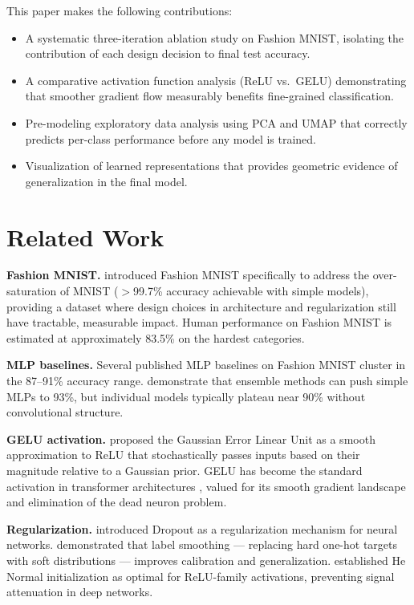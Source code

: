 \documentclass[12pt,letterpaper]{article}
\begin{document}
This paper makes the following contributions:
\begin{itemize}
    \item A systematic three-iteration ablation study on Fashion MNIST, isolating the contribution of each design decision to final test accuracy.
    \item A comparative activation function analysis (ReLU vs.\ GELU) demonstrating that smoother gradient flow measurably benefits fine-grained classification.
    \item Pre-modeling exploratory data analysis using PCA and UMAP that correctly predicts per-class performance before any model is trained.
    \item Visualization of learned representations that provides geometric evidence of generalization in the final model.
\end{itemize}

\section{Related Work}
\label{sec:related}

\textbf{Fashion MNIST.} \citet{xiao2017fashion} introduced Fashion MNIST specifically to address the over-saturation of MNIST ($>$99.7\% accuracy achievable with simple models), providing a dataset where design choices in architecture and regularization still have tractable, measurable impact. Human performance on Fashion MNIST is estimated at approximately 83.5\% on the hardest categories.

\textbf{MLP baselines.} Several published MLP baselines on Fashion MNIST cluster in the 87--91\% accuracy range. \citet{an2020ensemble} demonstrate that ensemble methods can push simple MLPs to 93\%, but individual models typically plateau near 90\% without convolutional structure.

\textbf{GELU activation.} \citet{hendrycks2016gelu} proposed the Gaussian Error Linear Unit as a smooth approximation to ReLU that stochastically passes inputs based on their magnitude relative to a Gaussian prior. GELU has become the standard activation in transformer architectures \citep{devlin2018bert, brown2020gpt3}, valued for its smooth gradient landscape and elimination of the dead neuron problem.

\textbf{Regularization.} \citet{srivastava2014dropout} introduced Dropout as a regularization mechanism for neural networks. \citet{szegedy2016rethinking} demonstrated that label smoothing — replacing hard one-hot targets with soft distributions — improves calibration and generalization. \citet{he2015delving} established He Normal initialization as optimal for ReLU-family activations, preventing signal attenuation in deep networks.
\end{document}
